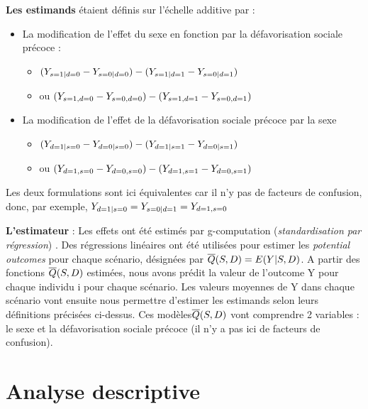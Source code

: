 \documentclass[
]{book}
\providecommand{\tightlist}{%
  \setlength{\itemsep}{0pt}\setlength{\parskip}{0pt}}
\begin{document}
\textbf{Les estimands} étaient définis sur l'échelle additive par :

\begin{itemize}
\tightlist
\item
  La modification de l'effet du sexe en fonction par la défavorisation sociale précoce :

  \begin{itemize}
  \tightlist
  \item
    \(\small (Y_{s=1|d=0} - Y_{s=0|d=0}) - (Y_{s=1|d=1} - Y_{s=0|d=1})\)
  \item
    ou \(\small (Y_{s=1,d=0} - Y_{s=0,d=0}) - (Y_{s=1,d=1} - Y_{s=0,d=1})\)
  \end{itemize}
\item
  La modification de l'effet de la défavorisation sociale précoce par la sexe

  \begin{itemize}
  \tightlist
  \item
    \(\small (Y_{d=1|s=0} - Y_{d=0|s=0}) - (Y_{d=1|s=1} - Y_{d=0|s=1})\)
  \item
    ou \(\small (Y_{d=1,s=0} - Y_{d=0,s=0}) - (Y_{d=1,s=1} - Y_{d=0,s=1})\)
  \end{itemize}
\end{itemize}

Les deux formulations sont ici équivalentes car il n'y pas de facteurs de confusion, donc, par exemple, \(\small Y_{d=1|s=0} = Y_{s=0|d=1} = Y_{d=1,s=0}\)

\textbf{L'estimateur} :
Les effets ont été estimés par g-computation (\emph{standardisation par régression}) \citet{hernan2020causal}.
Des régressions linéaires ont été utilisées pour estimer les \emph{potential outcomes} pour chaque scénario, désignées par \(\small \overline{Q}(S, D) = E(Y|S, D)\).
A partir des fonctions \(\small \overline{Q}(S, D)\) estimées, nous avons prédit la valeur de l'outcome Y pour chaque individu i pour chaque scénario. Les valeurs moyennes de Y dans chaque scénario vont ensuite nous permettre d'estimer les estimands selon leurs définitions précisées ci-dessus.
Ces modèles\(\small \overline{Q}(S, D)\) vont comprendre 2 variables : le sexe et la défavorisation sociale précoce (il n'y a pas ici de facteurs de confusion).

\hypertarget{analyse-descriptive}{%
\section{Analyse descriptive}\label{analyse-descriptive}}
\end{document}
